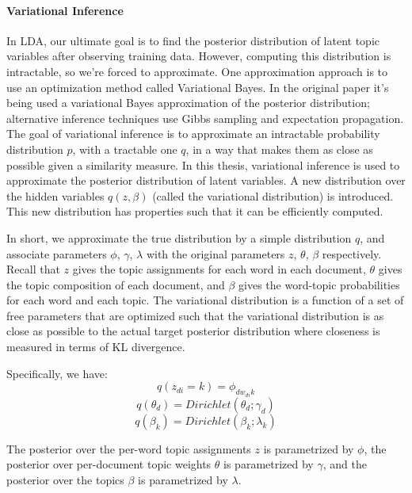 \documentclass[12pt]{report}
\begin{document}
\paragraph{Variational Inference}

In LDA, our ultimate goal is to find the posterior distribution of latent topic 
variables after observing training data. However, computing this distribution 
is intractable, so we're forced to approximate. One approximation approach is to 
use an optimization method called Variational Bayes. In the original paper it's 
being used a variational Bayes approximation of the posterior distribution;
\cite{blei2003latent} alternative inference techniques use Gibbs sampling and
expectation propagation. The goal of variational inference is to approximate an
intractable probability distribution $p$, with a tractable one $q$, in a way
that makes them as close as possible given a similarity measure. In this thesis,
variational inference is used to approximate the posterior distribution of
latent variables. A new distribution over the hidden variables $q(z, \beta)$
(called the variational distribution) is  introduced. This new distribution has
properties such that it can be efficiently computed.\cite{Fox2011ATO}

In short, we approximate the true distribution by a simple distribution $q$, and 
associate parameters $\phi$, $\gamma$, $\lambda$ with the original parameters 
$z$, $\theta$, $\beta$ respectively. Recall that $z$ gives the topic assignments 
for each word in each document, $\theta$ gives the topic composition of each 
document, and $\beta$ gives the word-topic probabilities for each word and each 
topic. The variational distribution is a function of a set of free parameters that 
are optimized such that the variational distribution is as close as possible to 
the actual target posterior distribution where closeness is measured in terms of 
KL divergence.

Specifically, we have:
\begin{equation}
q(z_{di}=k) = \phi_{dw_{di}k}
\end{equation}
\begin{equation}
q(\theta_{d}) = Dirichlet(\theta_{d}; \gamma_{d})
\end{equation}
\begin{equation}
q(\beta_{k}) = Dirichlet(\beta_{k}; \lambda_{k})
\end{equation}

The posterior over the per-word topic assignments $z$ is parametrized by
$\phi$, the posterior over per-document topic weights $\theta$ is parametrized
by $\gamma$, and the posterior over the topics $\beta$ is parametrized by
$\lambda$. 
\end{document}
